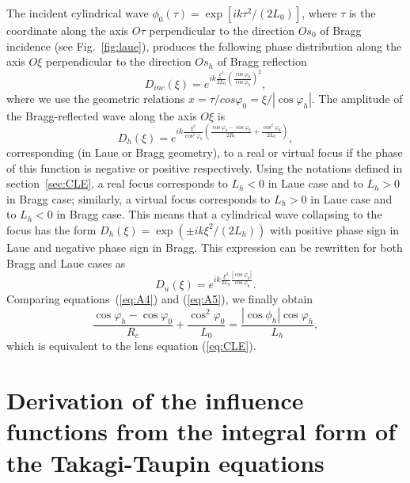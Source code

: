 \documentclass[preprint]{iucr}              %
\begin{document}
The incident cylindrical wave $\phi_0(\tau)=\exp[i k \tau^2 / (2L_0)]$, where $\tau$ is the coordinate along the axis $O\tau$ perpendicular to the direction $Os_0$ of Bragg incidence (see Fig.~\ref{fig:laue}), produces the following phase distribution along the axis $O\xi$ perpendicular to the direction $Os_h$ of Bragg reflection 
\begin{equation}
    D_{inc}(\xi) = e^{i k \frac{\xi^2}{2L_0}\left(\frac{\cos\varphi_0}{\cos\varphi_h}\right)^2},
\end{equation}
where we use the geometric relations $x=\tau/cos\varphi_0=\xi/|\cos\varphi_h|$. The amplitude of the Bragg-reflected wave along the axis $O\xi$ is
\begin{equation}
\label{eq:A4}
    D_h(\xi) = e^{i k
    \frac{\xi^2}{\cos^2\varphi_h}\left(\frac{\cos\varphi_h-\cos\varphi_0}{2R_c} + \frac{\cos^2\varphi_0}{2L_0}\right)},
\end{equation}
corresponding (in Laue or Bragg geometry), to a real or virtual focus if the phase of this function is negative or positive respectively. Using the notations defined in section~\ref{sec:CLE}, a real focus corresponds to $L_h<0$ in Laue case and to $L_h>0$ in Bragg case; similarly, a virtual focus corresponds to $L_h>0$ in Laue case and to $L_h<0$ in Bragg case. This means that a cylindrical wave collapsing to the focus has the form $D_h(\xi) = \exp(\pm i k \xi^2 / (2L_h))$ with positive phase sign in Laue and negative phase sign in Bragg. This expression can be rewritten for both Bragg and Laue cases as
\begin{equation}
\label{eq:A5}
D_u(\xi) = e^{i k \frac{\xi^2}{2 L_h}\frac{|\cos\varphi_h|}{\cos\varphi_h}}.   
\end{equation}
Comparing equations~(\ref{eq:A4}) and (\ref{eq:A5}), we finally obtain
\begin{equation}
    \frac{\cos\varphi_h-\cos\varphi_0}{R_c}+
    \frac{\cos^2\varphi_0}{L_0}=\frac{|\cos\phi_h|\cos\varphi_h}{L_h},
\end{equation}
which is equivalent to the lens equation (\ref{eq:CLE}).

\section{Derivation of the influence functions from the integral form of the Takagi-Taupin equations}
\label{appendix:TTEintegral}
\end{document}
